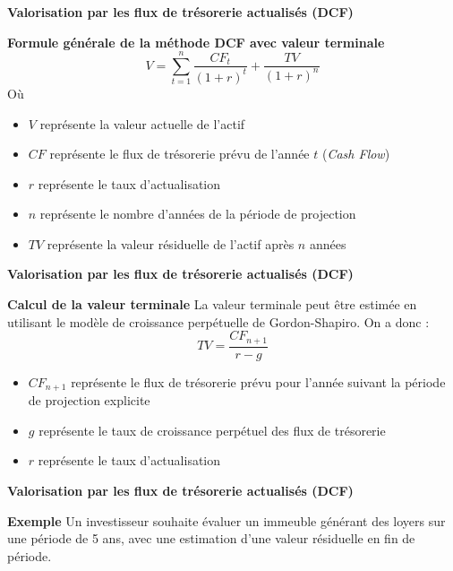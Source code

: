 \documentclass{beamer}
\begin{document}
\begin{frame}{\textbf{Valorisation par les flux de trésorerie actualisés (DCF)}}

\begin{alertblock}{\textbf{Formule générale de la méthode DCF avec valeur terminale}}
\[ V = \sum_{t=1}^n \frac{CF_t}{(1+r)^t}+\frac{TV}{(1+r)^n}\]
Où
\begin{itemize}
	\item \( V \) représente la valeur actuelle de l'actif
	\item \( CF \) représente le flux de trésorerie prévu de l'année \( t \) (\textit{Cash Flow})
	\item \( r \) représente le taux  d'actualisation
	\item \( n \) représente le nombre d'années de la période de projection
	\item \( TV \) représente la valeur résiduelle de l'actif après \( n \) années
\end{itemize}
\end{alertblock}
\end{frame}

\begin{frame}{\textbf{Valorisation par les flux de trésorerie actualisés (DCF)}}
	
\begin{alertblock}{\textbf{Calcul de la valeur terminale}}
La valeur terminale peut être estimée en utilisant le modèle de croissance perpétuelle de Gordon-Shapiro. On a donc :
\[ TV = \frac{CF_{n+1}}{r-g} \]
	
\begin{itemize}
	\item \( CF_{n+1} \) représente le flux de trésorerie prévu pour l'année suivant la période de projection explicite
	\item \( g \) représente le taux de croissance perpétuel des flux de trésorerie
	\item \( r \) représente le taux  d'actualisation
\end{itemize}
\end{alertblock}	
	
\end{frame}

\begin{frame}{\textbf{Valorisation par les flux de trésorerie actualisés (DCF)}}
	
\begin{exampleblock}{\textbf{Exemple}}
Un investisseur souhaite évaluer un immeuble générant des loyers sur une période de 5 ans, avec une estimation d’une valeur résiduelle en fin de période.
\end{exampleblock}	

\end{frame}
\end{document}
